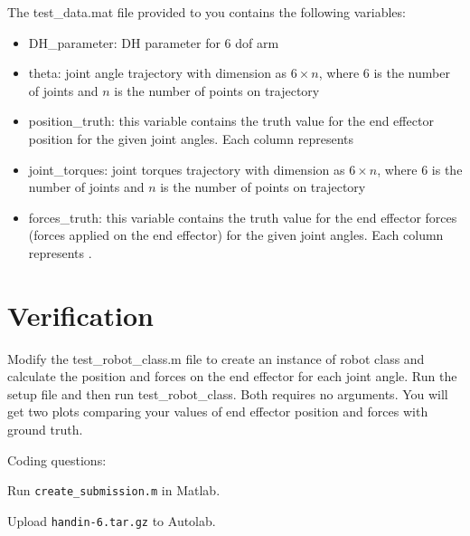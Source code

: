\documentclass{/home/puneet/Desktop/courses/16384/Assignments/16384_doc}
\begin{document}
The test\_data.mat file provided to you contains the following variables:
\begin{itemize}
\item DH\_parameter: DH parameter for 6 dof arm
\item theta: joint angle trajectory with dimension as $6\times n$, where 6 is the number of joints and $n$ is the number of points on trajectory
\item position\_truth: this variable contains the truth value for the end effector position for the given joint angles. Each column represents 
\item joint\_torques:  joint torques trajectory with dimension as $6\times n$, where 6 is the number of joints and $n$ is the number of points on trajectory
\item forces\_truth: this variable contains the truth value for the end effector forces (forces applied on the end effector) for the given joint angles. Each column represents .
\end{itemize}


\section{Verification}
Modify the test\_robot\_class.m file to create an instance of robot class and calculate the position  and forces  on the end effector for each joint angle. Run the setup file and then run test\_robot\_class. Both requires no arguments. You will get two plots comparing your values of end effector position and forces with ground truth. 

\begin{submissionChecklist}
		\item Coding questions:
    	\begin{checklist}
        	\item Run \verb!create_submission.m! in Matlab.
        	\item Upload \verb!handin-6.tar.gz! to Autolab.
    	\end{checklist}
	\end{submissionChecklist}
\end{document}
